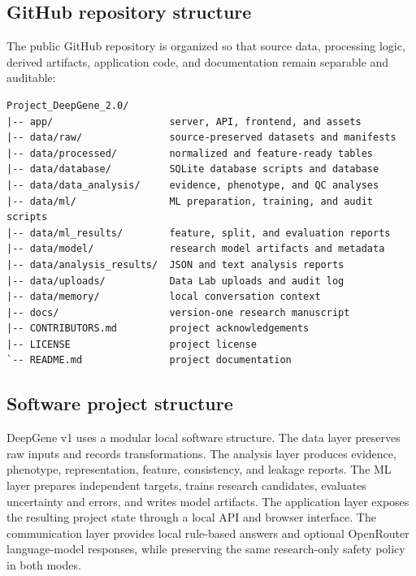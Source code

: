 \documentclass[12pt,a4paper]{article}
\begin{document}
\subsection{GitHub repository structure}
The public GitHub repository is organized so that source data, processing
logic, derived artifacts, application code, and documentation remain
separable and auditable:
\begin{verbatim}
Project_DeepGene_2.0/
|-- app/                    server, API, frontend, and assets
|-- data/raw/               source-preserved datasets and manifests
|-- data/processed/         normalized and feature-ready tables
|-- data/database/          SQLite database scripts and database
|-- data/data_analysis/     evidence, phenotype, and QC analyses
|-- data/ml/                ML preparation, training, and audit scripts
|-- data/ml_results/        feature, split, and evaluation reports
|-- data/model/             research model artifacts and metadata
|-- data/analysis_results/  JSON and text analysis reports
|-- data/uploads/           Data Lab uploads and audit log
|-- data/memory/            local conversation context
|-- docs/                   version-one research manuscript
|-- CONTRIBUTORS.md         project acknowledgements
|-- LICENSE                 project license
`-- README.md               project documentation
\end{verbatim}

\subsection{Software project structure}
DeepGene v1 uses a modular local software structure. The data layer preserves
raw inputs and records transformations. The analysis layer produces evidence,
phenotype, representation, feature, consistency, and leakage reports. The ML
layer prepares independent targets, trains research candidates, evaluates
uncertainty and errors, and writes model artifacts. The application layer
exposes the resulting project state through a local API and browser interface.
The communication layer provides local rule-based answers and optional
OpenRouter language-model responses, while preserving the same research-only
safety policy in both modes.
\end{document}
